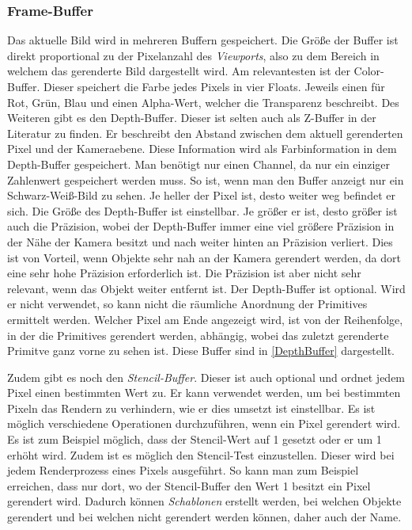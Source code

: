 \subsubsection{Frame-Buffer}
Das aktuelle Bild wird in mehreren Buffern gespeichert. Die Größe der Buffer ist direkt proportional zu der Pixelanzahl des \textit{Viewports}, also zu dem Bereich in welchem das gerenderte Bild dargestellt wird. 
Am relevantesten ist der Color-Buffer. Dieser speichert die Farbe jedes Pixels in vier Floats. Jeweils einen für Rot, Grün, Blau und einen Alpha-Wert, welcher die Transparenz beschreibt. Des Weiteren gibt es den Depth-Buffer. Dieser ist selten auch als Z-Buffer in der Literatur zu finden. Er beschreibt den Abstand zwischen dem aktuell gerenderten Pixel und der Kameraebene. Diese Information wird als Farbinformation in dem Depth-Buffer gespeichert. 
Man benötigt nur einen Channel, da nur ein einziger Zahlenwert gespeichert werden muss. So ist, wenn man den Buffer anzeigt nur ein Schwarz-Weiß-Bild zu sehen. Je heller der Pixel ist, desto weiter weg befindet er sich. Die Größe des Depth-Buffer ist einstellbar. Je größer er ist, desto größer ist auch die Präzision, wobei der Depth-Buffer immer eine viel größere Präzision in der Nähe der Kamera besitzt und nach weiter hinten an Präzision verliert. Dies ist von Vorteil, wenn Objekte sehr nah an der Kamera gerendert werden, da dort eine sehr hohe Präzision erforderlich ist. 
Die Präzision ist aber nicht sehr relevant, wenn das Objekt weiter entfernt ist. Der Depth-Buffer ist optional. Wird er nicht verwendet, so kann nicht die räumliche Anordnung der Primitives ermittelt werden. Welcher Pixel am Ende angezeigt wird, ist von der Reihenfolge, in der die Primitives gerendert werden, abhängig, wobei das zuletzt gerenderte Primitve ganz vorne zu sehen ist. Diese Buffer sind in \cref{DepthBuffer} dargestellt. 

Zudem gibt es noch den \textit{Stencil-Buffer}. Dieser ist auch optional und ordnet jedem Pixel einen bestimmten Wert zu. Er kann verwendet werden, um bei bestimmten Pixeln das Rendern zu verhindern, wie er dies umsetzt ist einstellbar. Es ist möglich verschiedene Operationen durchzuführen, wenn ein Pixel gerendert wird. Es ist zum Beispiel möglich, dass der Stencil-Wert auf 1 gesetzt oder er um 1 erhöht wird. Zudem ist es möglich den Stencil-Test einzustellen. Dieser wird bei jedem Renderprozess eines Pixels ausgeführt. So kann man zum Beispiel erreichen, dass nur dort, wo der Stencil-Buffer den Wert 1 besitzt ein Pixel gerendert wird. Dadurch können \textit{Schablonen} erstellt werden, bei welchen Objekte gerendert und bei welchen nicht gerendert werden können, daher auch der Name.


